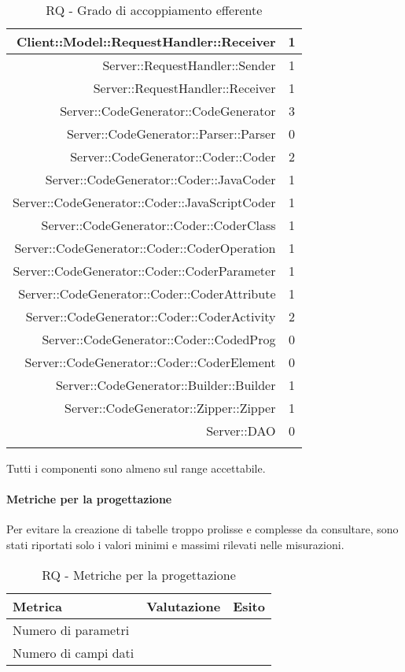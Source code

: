 \documentclass[../PianoDiQualifica.tex]{subfiles}
\begin{document}
\begin{longtable}{|r|c|}
						Client::Model::RequestHandler::Receiver & 1 \\ \hline
						Server::RequestHandler::Sender & 1 \\ \hline
						Server::RequestHandler::Receiver & 1 \\ \hline
						Server::CodeGenerator::CodeGenerator & 3 \\ \hline
						Server::CodeGenerator::Parser::Parser & 0 \\ \hline
						Server::CodeGenerator::Coder::Coder & 2 \\ \hline
						Server::CodeGenerator::Coder::JavaCoder & 1\\ \hline
						Server::CodeGenerator::Coder::JavaScriptCoder & 1\\ \hline
						Server::CodeGenerator::Coder::CoderClass & 1\\ \hline
						Server::CodeGenerator::Coder::CoderOperation & 1\\ \hline
						Server::CodeGenerator::Coder::CoderParameter & 1\\ \hline
						Server::CodeGenerator::Coder::CoderAttribute & 1\\ \hline
						Server::CodeGenerator::Coder::CoderActivity & 2\\ \hline
						Server::CodeGenerator::Coder::CodedProg & 0\\ \hline
						Server::CodeGenerator::Coder::CoderElement & 0\\ \hline
						Server::CodeGenerator::Builder::Builder & 1 \\ \hline
						Server::CodeGenerator::Zipper::Zipper & 1 \\ \hline
						Server::DAO & 0 \\ \hline
					\caption{RQ - Grado di accoppiamento efferente}
					\end{longtable}
					Tutti i componenti sono almeno sul range accettabile.
					\paragraph{Metriche per la progettazione\\}
						Per evitare la creazione di tabelle troppo prolisse e complesse da consultare,
						sono stati riportati solo i valori minimi e massimi rilevati nelle misurazioni.
						\begin{table}[H]
						\center
							\begin{tabular}{|l|c|c|}
								\hline
								\rowcolor{blue!30}\textbf{Metrica} & \textbf{Valutazione} & \textbf{Esito} \\ \hline
								Numero di parametri &  &  \\ \hline
								Numero di campi dati &  &  \\ \hline
							\end{tabular}
						\caption{RQ - Metriche per la progettazione}
						\end{table}
\end{document}
